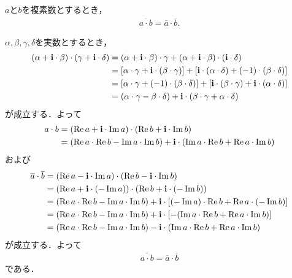 	\begin{screen}
		\begin{thm}[積の共役は共役の積]
		\label{thm:conjugate_of_product_is_product_of_conjugates}
			$a$と$b$を複素数とするとき，
			\begin{align}
				\overline{a \cdot b} = \overline{a} \cdot \overline{b}.
			\end{align}
		\end{thm}
	\end{screen}
	
	\begin{sketch}
		$\alpha,\beta,\gamma,\delta$を実数とするとき，
		\begin{align}
			(\alpha + \mathbf{i} \cdot \beta) \cdot (\gamma + \mathbf{i} \cdot \delta)
			&= (\alpha + \mathbf{i} \cdot \beta) \cdot \gamma
			+ (\alpha + \mathbf{i} \cdot \beta) \cdot (\mathbf{i} \cdot \delta) \\
			&= \left[\alpha \cdot \gamma + \mathbf{i} \cdot (\beta \cdot \gamma) \right]
			+ \left[\mathbf{i} \cdot (\alpha \cdot \delta) + (-1) \cdot (\beta \cdot \delta)\right] \\
			&= \left[\alpha \cdot \gamma + (-1) \cdot (\beta \cdot \delta)\right]
			+ \left[\mathbf{i} \cdot (\beta \cdot \gamma) + \mathbf{i} \cdot (\alpha \cdot \delta)\right] \\
			&= (\alpha \cdot \gamma - \beta \cdot \delta) + \mathbf{i} \cdot (\beta \cdot \gamma + \alpha \cdot \delta)
		\end{align}
		が成立する．よって
		\begin{align}
			a \cdot b 
			&= (\operatorname{Re} a + \mathbf{i} \cdot \operatorname{Im} a) \cdot (\operatorname{Re} b + \mathbf{i} \cdot \operatorname{Im} b) \\
			&= (\operatorname{Re} a \cdot \operatorname{Re} b - \operatorname{Im} a \cdot \operatorname{Im} b) 
			+ \mathbf{i} \cdot (\operatorname{Im} a \cdot \operatorname{Re} b + \operatorname{Re} a \cdot \operatorname{Im} b)
		\end{align}
		および
		\begin{align}
			\overline{a} \cdot \overline{b}
			&= (\operatorname{Re} a - \mathbf{i} \cdot \operatorname{Im} a) \cdot (\operatorname{Re} b - \mathbf{i} \cdot \operatorname{Im} b) \\
			&= (\operatorname{Re} a + \mathbf{i} \cdot (-\operatorname{Im} a)) \cdot (\operatorname{Re} b + \mathbf{i} \cdot (-\operatorname{Im} b)) \\
			&= (\operatorname{Re} a \cdot \operatorname{Re} b - \operatorname{Im} a \cdot \operatorname{Im} b) 
			+ \mathbf{i} \cdot \left[(-\operatorname{Im} a) \cdot \operatorname{Re} b + \operatorname{Re} a \cdot (-\operatorname{Im} b)\right] \\
			&= (\operatorname{Re} a \cdot \operatorname{Re} b - \operatorname{Im} a \cdot \operatorname{Im} b) 
			+ \mathbf{i} \cdot \left[-(\operatorname{Im} a \cdot \operatorname{Re} b + \operatorname{Re} a \cdot \operatorname{Im} b)\right] \\
			&= (\operatorname{Re} a \cdot \operatorname{Re} b - \operatorname{Im} a \cdot \operatorname{Im} b) 
			- \mathbf{i} \cdot (\operatorname{Im} a \cdot \operatorname{Re} b + \operatorname{Re} a \cdot \operatorname{Im} b)
		\end{align}
		が成立する．よって
		\begin{align}
			\overline{a \cdot b} = \overline{a} \cdot \overline{b}
		\end{align}
		である．
		\QED
	\end{sketch}
	
